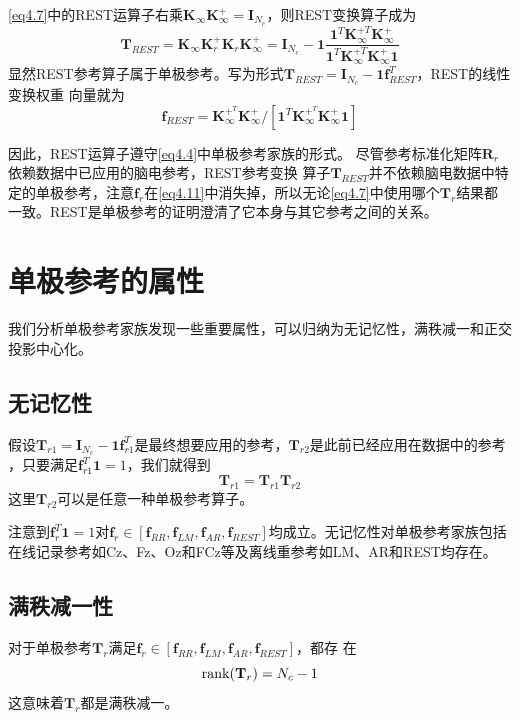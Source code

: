 \eqref{eq4.7}中的REST运算子右乘$\mathbf{K}_{\infty}\mathbf{K}_{\infty}^+=\mathbf{I}_{N_c}$，则REST变换算子成为
\begin{equation}\label{eq4.10}
\mathbf{T}_{REST}=\mathbf{K}_{\infty}\mathbf{K}_{r}^+\mathbf{K}_{r}\mathbf{K}_{\infty}^+=\mathbf{I}_{N_c}-\mathbf{1}\frac{\mathbf{1}^T\mathbf{K}_{\infty}^{+T}\mathbf{K}_{\infty}^+}{\mathbf{1}^T\mathbf{K}_{\infty}^{+T}\mathbf{K}_{\infty}^+\mathbf{1}}
\end{equation}
显然REST参考算子属于单极参考。写为形式$\mathbf{T}_{REST}=\mathbf{I}_{N_c}-\mathbf{1}\mathbf{f}_{REST}^T$，REST的线性变换权重
向量就为
\begin{equation}\label{eq4.11}
\mathbf{f}_{REST}=\mathbf{K}_{\infty}^{+^T}\mathbf{K}_{\infty}^+/{[\mathbf{1}^T\mathbf{K}_{\infty}^{+^T}\mathbf{K}_{\infty}^+\mathbf{1}]}
\end{equation}

因此，REST运算子遵守\eqref{eq4.4}中单极参考家族的形式。 尽管参考标准化矩阵$\mathbf{R}_r$依赖数据中已应用的脑电参考，REST参考变换
算子$\mathbf{T}_{REST}$并不依赖脑电数据中特定的单极参考，注意$\mathbf{f}_r$在\eqref{eq4.11}中消失掉，所以无论\eqref{eq4.7}中使用哪个$\mathbf{T}_r$结果都一致。REST是单极参考的证明澄清了它本身与其它参考之间的关系。

\section{单极参考的属性}
我们分析单极参考家族发现一些重要属性，可以归纳为无记忆性，满秩减一和正交投影中心化。

\subsection{无记忆性}
假设$\mathbf{T}_{r1}=\mathbf{I}_{N_c}-\mathbf{1f}_{r1}^T$是最终想要应用的参考，$\mathbf{T}_{r2}$是此前已经应用在数据中的参考
，只要满足$\mathbf{f}_{r1}^T\mathbf{1}=1$，我们就得到
\begin{equation}\label{eq4.12}
\mathbf{T}_{r1}=\mathbf{T}_{r1}\mathbf{T}_{r2}
\end{equation}
这里$\mathbf{T}_{r2}$可以是任意一种单极参考算子。

注意到$\mathbf{f}_r^T\mathbf{1}=1$对$\mathbf{f}_r\in{[\mathbf{f}_{RR},\mathbf{f}_{LM},\mathbf{f}_{AR},\mathbf{f}_{REST}]}$均成立。无记忆性对单极参考家族包括在线记录参考如Cz、Fz、Oz和FCz等及离线重参考如LM、AR和REST均存在。
\subsection{满秩减一性} 
对于单极参考$\mathbf{T}_r$满足$\mathbf{f}_r\in{[\mathbf{f}_{RR},\mathbf{f}_{LM},\mathbf{f}_{AR},\mathbf{f}_{REST}]}$，都存
在
\begin{equation}\label{eq4.13}
\operatorname{rank}(\mathbf{T}_r)=N_c-1
\end{equation}
这意味着$\mathbf{T}_r$都是满秩减一。

